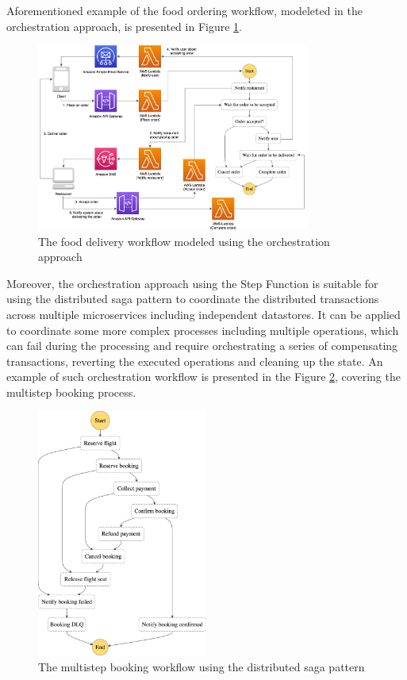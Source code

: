 Aforementioned example of the food ordering workflow, modeleted in the orchestration approach, is presented in Figure \ref{fig:orchestration-diagram}.

\begin{figure}[H]
   \centering
   \includegraphics[width=0.8\textwidth]{assets/04-serverless-for-web-apps/orchestration.png}
   \caption{The food delivery workflow modeled using the orchestration approach}
   \label{fig:orchestration-diagram}
\end{figure}

Moreover, the orchestration approach using the Step Function is suitable for using the distributed saga pattern \cite{SagaPattern} to coordinate the distributed transactions across multiple microservices including independent datastores.
It can be applied to coordinate some more complex processes including multiple operations, which can fail during the processing and require orchestrating a series of compensating transactions, reverting the executed operations and cleaning up the state.
An example of such orchestration workflow is presented in the Figure \ref{fig:saga-orchestration-diagram}, covering the multistep booking process.

\begin{figure}[H]
   \centering
   \includegraphics[width=0.5\textwidth]{assets/04-serverless-for-web-apps/saga.png}
   \caption{The multistep booking workflow using the distributed saga pattern}
   \label{fig:saga-orchestration-diagram}
\end{figure}

